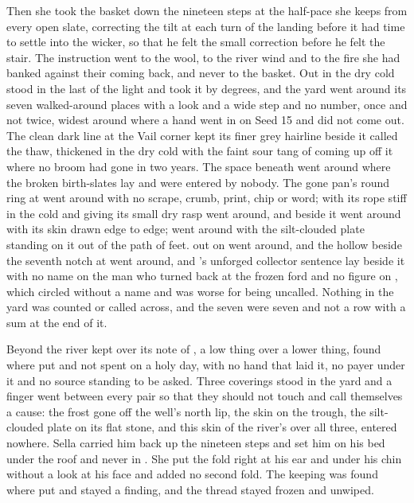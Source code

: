 Then she took the basket down the nineteen steps at the half-pace she keeps from every open slate, correcting the tilt at each turn of the landing before it had time to settle into the wicker, so that he felt the small correction before he felt the stair. The instruction went to the wool, to the river wind and to the fire she had banked against their coming back, and never to the basket. Out in  the dry cold stood in the last of the light and took it by degrees, and the yard went around its seven walked-around places with a look and a wide step and no number, once and not twice, widest around  where a hand went in on Seed 15 and did not come out. The clean dark line at the Vail corner kept its finer grey hairline beside it called the thaw, thickened in the dry cold with the faint sour tang of  coming up off it where no broom had gone in two years. The space beneath  went around where the broken birth-slates lay and were entered by nobody. The gone pan's round ring at  went around with no scrape, crumb, print, chip or word;  with its rope stiff in the cold and giving its small dry rasp went around, and  beside it went around with its skin drawn edge to edge;  went around with the silt-clouded plate standing on it out of the path of feet.  out on  went around, and the hollow beside the seventh notch at  went around, and 's unforged collector sentence lay beside it with no name on the man who turned back at the frozen ford and no figure on , which circled without a name and was worse for being uncalled. Nothing in the yard was counted or called across, and the seven were seven and not a row with a sum at the end of it.

Beyond  the river kept  over its note of , a low thing over a lower thing, found where put and not spent on a holy day, with no hand that laid it, no payer under it and no source standing to be asked. Three coverings stood in the yard and a finger went between every pair so that they should not touch and call themselves a cause: the frost gone off the well's north lip, the skin on the trough, the silt-clouded plate on its flat stone, and this skin of the river's over all three, entered nowhere. Sella carried him back up the nineteen steps and set him on his bed under the roof and never in . She put the fold right at his ear and under his chin without a look at his face and added no second fold. The keeping was found where put and stayed a finding, and the thread stayed frozen and unwiped.

